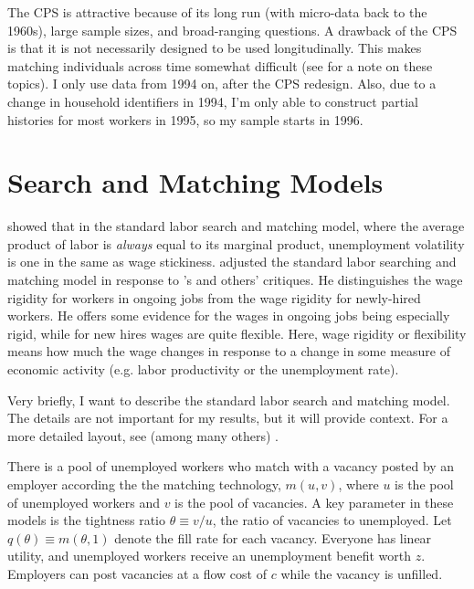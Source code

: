 \documentclass[11pt]{article}
\begin{document}
The CPS is attractive because of its long run (with micro-data back to the 1960s), large sample sizes, and broad-ranging questions.
A drawback of the CPS is that it is not necessarily designed to be used longitudinally.
This makes matching individuals across time somewhat difficult (see \cite{madrian1999note} for a note on these topics).
I only use data from 1994 on, after the CPS redesign.
Also, due to a change in household identifiers in 1994, I'm only able to construct partial histories for most workers in 1995, so my sample starts in 1996.


\section{Search and Matching Models}
\label{sec:search_and_matching_models}

\cite{hall_milgrom_2008} showed that in the standard labor search and matching model, where the average product of labor is \emph{always} equal to its marginal product, unemployment volatility is one in the same as wage stickiness.
\cite{pissarides_2009} adjusted the standard labor searching and matching model in response to \cite{shimer_2005}'s and others' critiques.
He distinguishes the wage rigidity for workers in ongoing jobs from the wage rigidity for newly-hired workers.
He offers some evidence for the wages in ongoing jobs being especially rigid, while for new hires wages are quite flexible.
Here, wage rigidity or flexibility means how much the wage changes in response to a change in some measure of economic activity (e.g. labor productivity or the unemployment rate).

Very briefly, I want to describe the standard labor search and matching model.
The details are not important for my results, but it will provide context.
For a more detailed layout, see (among many others) \cite{pissarides_2009}.

There is a pool of unemployed workers who match with a vacancy posted by an employer according the the matching technology, $m(u, v)$,
where $u$ is the pool of unemployed workers and $v$ is the pool of vacancies.
A key parameter in these models is the tightness ratio $\theta \equiv v/u$, the ratio of vacancies to unemployed.
Let $q(\theta) \equiv m(\theta, 1)$ denote the fill rate for each vacancy.
Everyone has linear utility, and unemployed workers receive an unemployment benefit worth $z$.
Employers can post vacancies at a flow cost of $c$ while the vacancy is unfilled.
\end{document}
